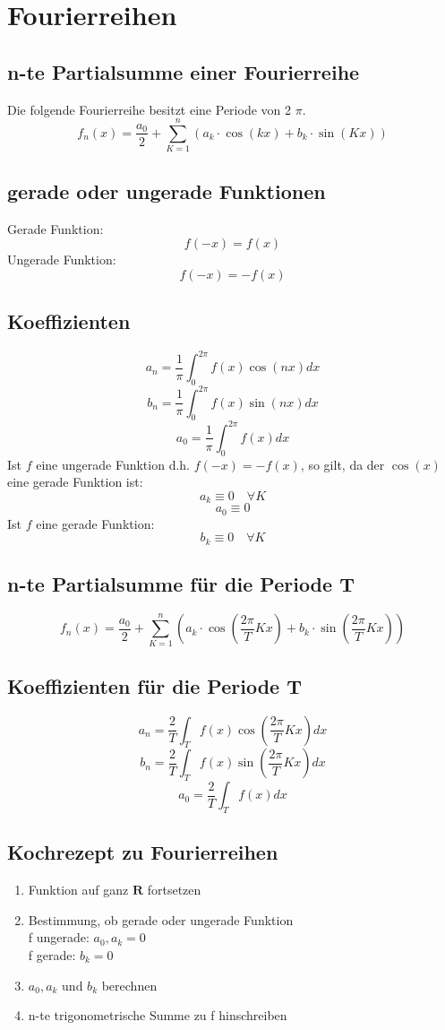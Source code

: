 \section{Fourierreihen}

\subsection{n-te Partialsumme einer Fourierreihe}
Die folgende Fourierreihe besitzt eine Periode von 2 $\pi$. 
\[ \boxed{f_n(x) = \frac{a_0}{2} + \sum_{K=1}^n \left(a_k \cdot \cos(kx) + b_k \cdot \sin(Kx)\right)} \]

\subsection{gerade oder ungerade Funktionen}
Gerade Funktion: 
\[ \boxed{f(-x) = f(x)} \]
Ungerade Funktion: 
\[ \boxed{f(-x) = -f(x)} \]

\subsection{Koeffizienten}
\[ \boxed{a_n = \frac{1}{\pi} \int_0^{2 \pi} f(x) \cos(nx) dx} \]
\[ \boxed{b_n = \frac{1}{\pi} \int_0^{2 \pi} f(x) \sin(nx) dx} \]
\[ \boxed{a_0 = \frac{1}{\pi} \int_0^{2 \pi} f(x) dx
} \]
Ist $f$ eine ungerade Funktion d.h. $f(-x) = -f(x)$, so gilt, da der $\cos(x)$ eine gerade Funktion ist: 
\[ a_k \equiv 0 \quad \forall K\]
\[ a_0 \equiv 0 \]
Ist $f$ eine gerade Funktion: 
\[ b_k \equiv 0 \quad \forall K \]

\subsection{n-te Partialsumme für die Periode T}
\[ \boxed{f_n(x) = \frac{a_0}{2} + \sum_{K=1}^n \left(a_k \cdot \cos \left(\frac{2 \pi}{T} K x\right) + b_k \cdot \sin\left(\frac{2 \pi}{T} K x\right)\right)} \]

\subsection{Koeffizienten für die Periode T}
\[ \boxed{a_n = \frac{2}{T} \int_T f(x) \cos(\frac{2 \pi}{T} K x) dx} \]
\[ \boxed{b_n = \frac{2}{T} \int_T f(x) \sin(\frac{2 \pi}{T} K x) dx} \]
\[ \boxed{a_0 = \frac{2}{T} \int_T f(x) dx
} \]

\subsection{Kochrezept zu Fourierreihen}
\begin{enumerate}
  \item Funktion auf ganz $\mathbf{R}$ fortsetzen
  \item Bestimmung, ob gerade oder ungerade Funktion\\
  f ungerade: $a_0, a_k = 0$\\
  f gerade: $b_k = 0$
  \item $a_0, a_k$ und $b_k$ berechnen
  \item n-te trigonometrische Summe zu f hinschreiben
\end{enumerate}


